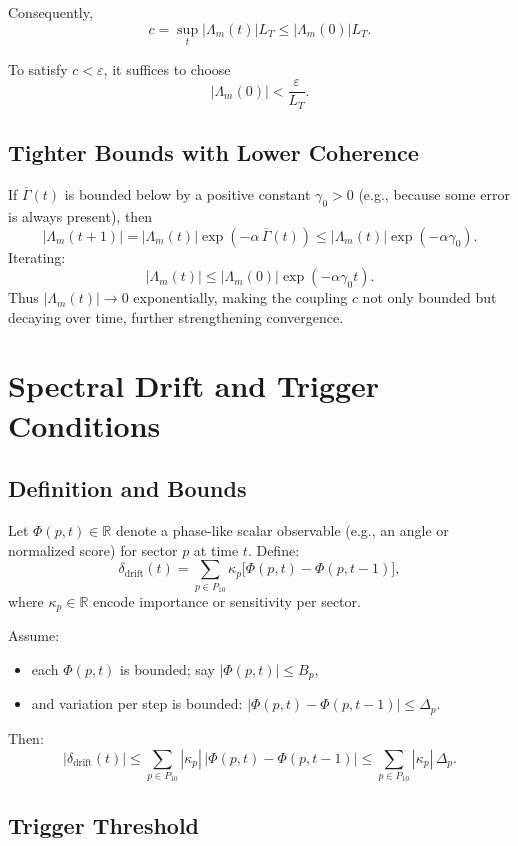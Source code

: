 \documentclass[11pt]{article}
\begin{document}
Consequently,
\[
  c = \sup_t |\Lambda_m(t)| L_T \leq |\Lambda_m(0)| L_T.
\]

To satisfy \(c < \varepsilon\), it suffices to choose
\[
  |\Lambda_m(0)| < \frac{\varepsilon}{L_T}.
\]

\subsection{Tighter Bounds with Lower Coherence}

If \(\overline{\Gamma}(t)\) is bounded below by a positive constant \(\gamma_0 > 0\) (e.g., because some error is always present), then
\[
  |\Lambda_m(t+1)|
  = |\Lambda_m(t)| \exp(-\alpha \, \overline{\Gamma}(t))
  \leq |\Lambda_m(t)| \exp(-\alpha \gamma_0).
\]
Iterating:
\[
  |\Lambda_m(t)| \leq |\Lambda_m(0)| \exp(-\alpha \gamma_0 t).
\]
Thus \(|\Lambda_m(t)| \to 0\) exponentially, making the coupling \(c\) not only bounded but decaying over time, further strengthening convergence.

\section{Spectral Drift and Trigger Conditions}

\subsection{Definition and Bounds}

Let \(\Phi(p,t) \in \mathbb{R}\) denote a phase-like scalar observable (e.g., an angle or normalized score) for sector \(p\) at time \(t\). Define:
\[
  \delta_{\text{drift}}(t)
  = \sum_{p \in P_{10}} \kappa_p \big[\Phi(p,t) - \Phi(p,t-1)\big],
\]
where \(\kappa_p \in \mathbb{R}\) encode importance or sensitivity per sector.

Assume:
\begin{itemize}
  \item each \(\Phi(p,t)\) is bounded; say \(|\Phi(p,t)| \leq B_p\),
  \item and variation per step is bounded: \(|\Phi(p,t) - \Phi(p,t-1)| \leq \Delta_p\).
\end{itemize}

Then:
\[
  |\delta_{\text{drift}}(t)|
  \leq \sum_{p \in P_{10}} |\kappa_p| \, |\Phi(p,t) - \Phi(p,t-1)|
  \leq \sum_{p \in P_{10}} |\kappa_p| \, \Delta_p.
\]

\subsection{Trigger Threshold}
\end{document}
